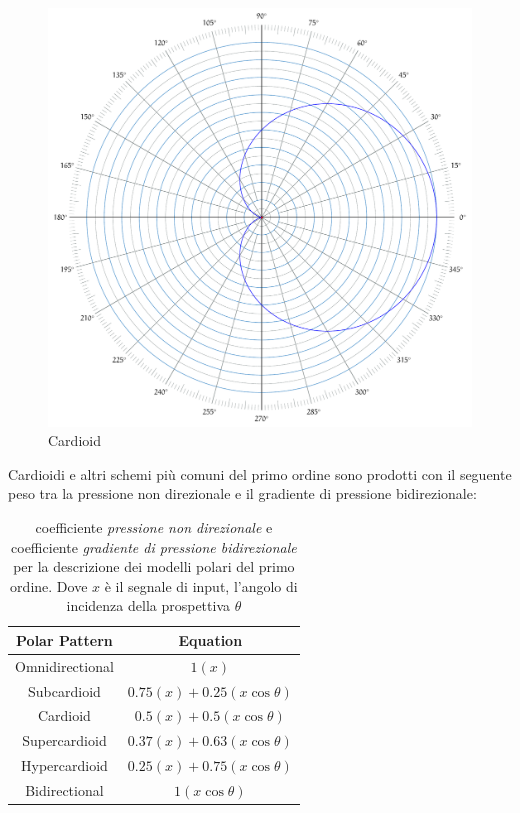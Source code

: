 \begin{figure}[h]
\centering
\includegraphics[width=1\columnwidth]{CAPITOLI/_TIKZ/POLAR/cardioid}
\caption{Cardioid}
\label{fig:mspan}
\end{figure}

Cardioidi e altri schemi più comuni del primo ordine sono prodotti con il
seguente peso tra la pressione non direzionale e il gradiente di pressione
bidirezionale:

\begin{table}[h]
\begin{center}
\begin{tabular}{cc}
Polar Pattern & Equation \\
\hline
Omnidirectional & $ 1(x) $ \\
Subcardioid     & $ 0.75(x) + 0.25(x\cos\theta) $ \\
Cardioid        & $ 0.5(x) + 0.5(x\cos\theta) $ \\
Supercardioid   & $ 0.37(x) + 0.63(x\cos\theta) $ \\
Hypercardioid   & $ 0.25(x) + 0.75(x\cos\theta) $ \\
Bidirectional   & $ 1(x\cos\theta) $ \\
\end{tabular}
\end{center}
\caption{coefficiente \emph{pressione non direzionale} e coefficiente
\emph{gradiente di pressione bidirezionale} per la descrizione dei modelli
polari del primo ordine. Dove $ x $ è il segnale di input, l'angolo di incidenza
della prospettiva $\theta$}
\label{tab:example}
\end{table}

